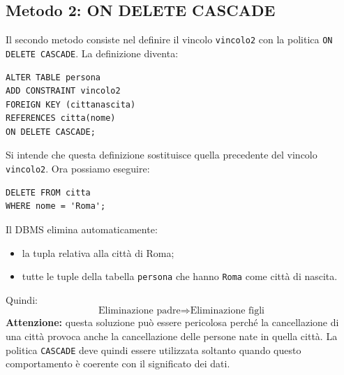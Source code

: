 \subsection{Metodo 2: ON DELETE CASCADE}
Il secondo metodo consiste
nel definire il vincolo
\texttt{vincolo2} con la politica
\texttt{ON DELETE CASCADE}.
La definizione diventa:
\begin{verbatim}
ALTER TABLE persona
ADD CONSTRAINT vincolo2
FOREIGN KEY (cittanascita)
REFERENCES citta(nome)
ON DELETE CASCADE;
\end{verbatim}
Si intende che questa definizione
sostituisce quella precedente
del vincolo \texttt{vincolo2}.
Ora possiamo eseguire:
\begin{verbatim}
DELETE FROM citta
WHERE nome = 'Roma';
\end{verbatim}
Il DBMS elimina automaticamente:
\begin{itemize}
    \item la tupla relativa
    alla città di Roma;

    \item tutte le tuple della
    tabella \texttt{persona}
    che hanno \texttt{Roma}
    come città di nascita.
\end{itemize}
Quindi:
\[
\boxed{
\text{Eliminazione padre}
\Rightarrow
\text{Eliminazione figli}
}
\]
\textbf{Attenzione:} questa soluzione
può essere pericolosa perché
la cancellazione di una città
provoca anche la cancellazione
delle persone nate in quella città.
La politica \texttt{CASCADE}
deve quindi essere utilizzata
soltanto quando questo comportamento
è coerente con il significato dei dati.

